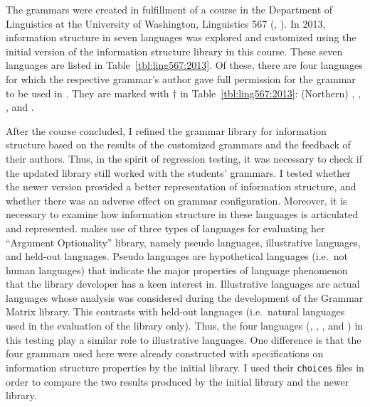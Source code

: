 \newpage 
The grammars were created in fulfillment of a 
course in the Department of Linguistics at the University of
Washington, Linguistics 567
(, \citealt{bender:07}).
In 2013, information structure in seven languages was explored and
customized using the initial version of the information structure
library in this course.  These seven languages are listed in
Table~\ref{tbl:ling567:2013}.  Of these, there are four languages for
which the respective grammar's author gave full permission for the
grammar to be used in .  They are marked with
\ensuremath{\dagger} in Table~\ref{tbl:ling567:2013}: (Northern)
, , , and .


After the course concluded, I refined the grammar library for
information structure based on the results of the customized grammars
and the feedback of their authors.  Thus, in the spirit of regression
testing, it was necessary to check if the updated library still worked
with the students' grammars. I tested whether the
newer version provided a better representation of information
structure, and whether there was an adverse effect on grammar
configuration. Moreover, it is necessary to examine how information
structure in these languages is articulated and represented.
\citet{saleem:10} makes use of three types of languages for evaluating
her ``Argument Optionality'' library, namely pseudo languages,
illustrative languages, and held-out languages.
Pseudo languages are hypothetical languages 
(i.e.\ not human languages) that indicate the
major properties of language phenomenon that the library developer has
a keen interest in.  Illustrative languages are actual languages whose
analysis was considered during the development of the Grammar Matrix
library.  This contrasts with held-out languages (i.e.\ natural
languages used in the evaluation of the library only).  Thus, the four
languages (, , , and
) in this testing play a similar role to illustrative
languages.  One difference is that the four grammars used here were
already constructed with specifications on information structure
properties by the initial library.  I used their \texttt{choices}
files in order to compare the two results produced by the initial
library and the newer library.







